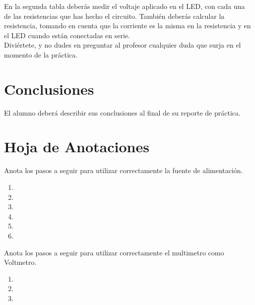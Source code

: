     En la segunda tabla deberás medir el voltaje aplicado en el LED, con cada una de las resistencias que has hecho el circuito. También deberás calcular la resistencia, tomando en cuenta que la corriente es la misma en la resistencia y en el LED cuando están conectadas en serie. \\

    Diviértete, y no dudes en preguntar al profesor cualquier duda que surja en el momento de la práctica. \\


\section{Conclusiones}
	El alumno deberá describir sus conclusiones al final de su reporte de práctica.

\begin{center}
	\huge \textthing
\end{center}
    

\clearpage
\section{Hoja de Anotaciones}
	Anota los pasos a seguir para utilizar correctamente la fuente de alimentación.

	\begin{enumerate}
		\item
		\item
		\item
		\item
		\item
		\item
	\end{enumerate}

	Anota los pasos a seguir para utilizar correctamente el multimetro como Voltmetro.

	\begin{enumerate}
		\item
		\item
		\item
	\end{enumerate}

